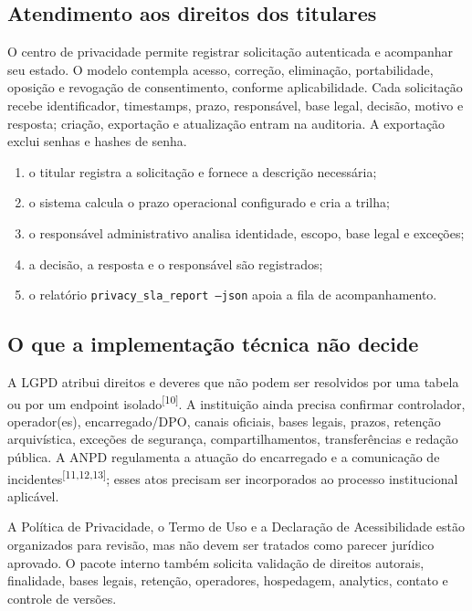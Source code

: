 \documentclass[11pt,a4paper]{article}
\newcommand{\code}[1]{\texttt{#1}}
\newcommand{\sourcecite}[1]{\textsuperscript{[#1]}}
\begin{document}
\subsection{Atendimento aos direitos dos titulares}

O centro de privacidade permite registrar solicitação autenticada e acompanhar seu estado. O modelo contempla acesso, correção, eliminação, portabilidade, oposição e revogação de consentimento, conforme aplicabilidade. Cada solicitação recebe identificador, timestamps, prazo, responsável, base legal, decisão, motivo e resposta; criação, exportação e atualização entram na auditoria. A exportação exclui senhas e hashes de senha.

\begin{enumerate}
  \item o titular registra a solicitação e fornece a descrição necessária;
  \item o sistema calcula o prazo operacional configurado e cria a trilha;
  \item o responsável administrativo analisa identidade, escopo, base legal e exceções;
  \item a decisão, a resposta e o responsável são registrados;
  \item o relatório \code{privacy\_sla\_report --json} apoia a fila de acompanhamento.
\end{enumerate}

\subsection{O que a implementação técnica não decide}

A LGPD atribui direitos e deveres que não podem ser resolvidos por uma tabela ou por um endpoint isolado\sourcecite{10}. A instituição ainda precisa confirmar controlador, operador(es), encarregado/DPO, canais oficiais, bases legais, prazos, retenção arquivística, exceções de segurança, compartilhamentos, transferências e redação pública. A ANPD regulamenta a atuação do encarregado e a comunicação de incidentes\sourcecite{11,12,13}; esses atos precisam ser incorporados ao processo institucional aplicável.

\begin{limitbox}[title=Revisão jurídica formal pendente]
A Política de Privacidade, o Termo de Uso e a Declaração de Acessibilidade estão organizados para revisão, mas não devem ser tratados como parecer jurídico aprovado. O pacote interno também solicita validação de direitos autorais, finalidade, bases legais, retenção, operadores, hospedagem, analytics, contato e controle de versões.
\end{limitbox}
\end{document}
